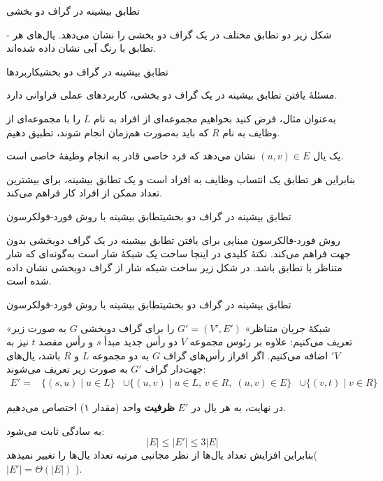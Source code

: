 \begin{itemframe}{تطابق بیشینه در گراف دو بخشی}
\item[-]
شکل زیر دو تطابق مختلف در یک گراف دو بخشی را نشان می‌دهد. یال‌های هر تطابق با رنگ آبی نشان داده شده‌اند.

\end{itemframe}


\begin{itemframe-s}{تطابق بیشینه در گراف دو بخشی}{کاربرد‌ها}
\item[-]
مسئلهٔ یافتن تطابق بیشینه در یک گراف دو بخشی، کاربردهای عملی فراوانی دارد.
\item[-]
 به‌عنوان مثال، فرض کنید بخواهیم مجموعه‌ای از افراد‌ به نام $L$ را با مجموعه‌ای از وظایف به نام $R$ که باید به‌صورت هم‌زمان انجام شوند، تطبیق دهیم.

یک یال
 $(u, v) \in E$
نشان می‌دهد که فرد خاصی قادر به انجام وظیفهٔ خاصی است.
\item[-]
بنابراین هر تطابق یک انتساب وظایف به افراد‌ است و یک تطابق بیشینه، برای بیشترین تعداد ممکن از افراد‌ کار فراهم می‌کند.
\end{itemframe-s}


\begin{itemframe-s}{تطابق بیشینه در گراف دو بخشی}{تطابق بیشینه با روش فورد-فولکرسون}
\item[-]
روش فورد-فالکرسون مبنایی برای یافتن تطابق بیشینه در یک گراف دوبخشی بدون جهت فراهم می‌کند. نکتهٔ کلیدی در اینجا ساخت یک شبکهٔ شار است به‌گونه‌ای که شار متناظر با تطابق باشد. در شکل زیر ساخت شبکه شار از گراف دوبخشی نشان داده شده است.

\end{itemframe-s}


\begin{itemframe-s}{تطابق بیشینه در گراف دو بخشی}{تطابق بیشینه با روش فورد-فولکرسون}
\item[-]
«شبکهٔ جریان متناظر»
 $G' = (V', E')$
را برای گراف دوبخشی $G$ به صورت زیر تعریف می‌کنیم:
علاوه بر رئوس مجموعه $V$ دو رأس جدید مبدأ $s$ و رأس مقصد $t$ نیز به $'V$ اضافه می‌کنیم.
اگر افراز رأس‌های گراف $G$ به دو مجموعه $L$ و $R$ باشد، یال‌های جهت‌دار گراف $G'$ به صورت زیر تعریف می‌شوند:
\begin{align*}
E' = & \{(s, u) \mid u \in L\}
 	  &\cup \{(u, v) \mid u \in L,\, v \in R,\; (u, v) \in E\}
	  &\cup \{(v, t) \mid v \in R\}
\end{align*}
\item[-]
در نهایت، به هر یال در $E'$
 \textbf{ظرفیت}
واحد (مقدار ۱) اختصاص می‌دهیم.
\item[-]
به سادگی ثابت می‌شود:
$$
|E| \leq |E'| \leq 3|E|
$$
بنابراین افزایش تعداد یال‌ها از نظر مجانبی مرتبه تعداد یال‌ها را تغییر نمیدهد(
$|E'| = \Theta(|E|)$
).
\end{itemframe-s}


